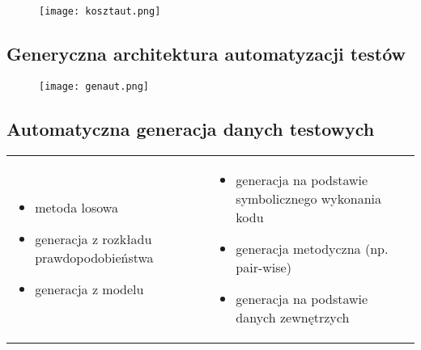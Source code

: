 \documentclass[../main.tex]{subfiles}
\begin{document}
    \begin{figure}[H]
        \texttt{[image: kosztaut.png]}
    \end{figure}

    \subsection{ Generyczna architektura automatyzacji testów}
    \begin{figure}[H]
        \texttt{[image: genaut.png]}
    \end{figure}

    \subsection{Automatyczna generacja danych testowych}
    \begin{table}[H]
        \begin{center}
            \begin{tabular}{p{8cm} p{8cm}}
                \begin{itemize}
                    \item metoda losowa
                    \item generacja z rozkładu prawdopodobieństwa
                    \item generacja z modelu
                \end{itemize}
                &
                \begin{itemize}
                    \item generacja na podstawie symbolicznego wykonania kodu
                    \item generacja metodyczna (np. pair-wise)
                    \item generacja na podstawie danych zewnętrzych
                \end{itemize}
            \end{tabular}
        \end{center}
    \end{table}
\end{document}
